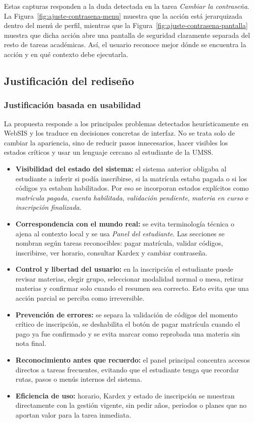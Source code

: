 Estas capturas responden a la duda detectada en la tarea \textit{Cambiar la contrase\~na}. La Figura~\ref{fig:ajuste-contrasena-menu} muestra que la acci\'on est\'a jerarquizada dentro del men\'u de perfil, mientras que la Figura~\ref{fig:ajuste-contrasena-pantalla} muestra que dicha acci\'on abre una pantalla de seguridad claramente separada del resto de tareas acad\'emicas. As\'i, el usuario reconoce mejor d\'onde se encuentra la acci\'on y en qu\'e contexto debe ejecutarla.

\subsection{Justificación del rediseño}


\subsubsection*{Justificación basada en usabilidad}

La propuesta responde a los principales problemas detectados heurísticamente en WebSIS y los traduce en decisiones concretas de interfaz. No se trata solo de cambiar la apariencia, sino de reducir pasos innecesarios, hacer visibles los estados críticos y usar un lenguaje cercano al estudiante de la UMSS.

\begin{itemize}
  \item \textbf{Visibilidad del estado del sistema:} el sistema anterior obligaba al estudiante a inferir si podía inscribirse, si la matrícula estaba pagada o si los códigos ya estaban habilitados. Por eso se incorporan estados explícitos como \textit{matrícula pagada}, \textit{cuenta habilitada}, \textit{validación pendiente}, \textit{materia en curso} e \textit{inscripción finalizada}.
  \item \textbf{Correspondencia con el mundo real:} se evita terminología técnica o ajena al contexto local y se usa \textit{Panel del estudiante}. Las secciones se nombran según tareas reconocibles: pagar matrícula, validar códigos, inscribirse, ver horario, consultar Kardex y cambiar contraseña.
  \item \textbf{Control y libertad del usuario:} en la inscripción el estudiante puede revisar materias, elegir grupo, seleccionar modalidad normal o mesa, retirar materias y confirmar solo cuando el resumen sea correcto. Esto evita que una acción parcial se perciba como irreversible.
  \item \textbf{Prevención de errores:} se separa la validación de códigos del momento crítico de inscripción, se deshabilita el botón de pagar matrícula cuando el pago ya fue confirmado y se evita marcar como reprobada una materia sin nota final.
  \item \textbf{Reconocimiento antes que recuerdo:} el panel principal concentra accesos directos a tareas frecuentes, evitando que el estudiante tenga que recordar rutas, pasos o menús internos del sistema.
  \item \textbf{Eficiencia de uso:} horario, Kardex y estado de inscripción se muestran directamente con la gestión vigente, sin pedir años, periodos o planes que no aportan valor para la tarea inmediata.
\end{itemize}

